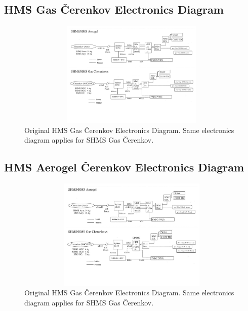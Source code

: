 \documentclass[11pt]{article}
\begin{document}
\begin{appendices}
\subsection{HMS Gas \v{C}erenkov Electronics Diagram}
\label{appendix:Appx3}
\begin{figure}[h!]
  \centering
  \includegraphics[width=7.0in, height=2.0in]{images/HMS_Cer_trig.pdf}
  \caption{Original HMS Gas \v{C}erenkov Electronics Diagram. Same electronics diagram applies for SHMS Gas \v{C}erenkov.}
  \label{fig:hms_gas_cer_trg}
\end{figure}

\subsection{HMS Aerogel \v{C}erenkov Electronics Diagram}
\label{appendix:Appx4}
\begin{figure}[h!]
  \centering
  \includegraphics[width=6.5in, height=2.1in]{images/HMS_Aero_trig.pdf}
  \caption{Original HMS Gas \v{C}erenkov Electronics Diagram. Same electronics diagram applies for SHMS Gas \v{C}erenkov.}
  \label{fig:hms_gas_cer_trg}
\end{figure}
\newpage

\end{appendices}
\end{document}
